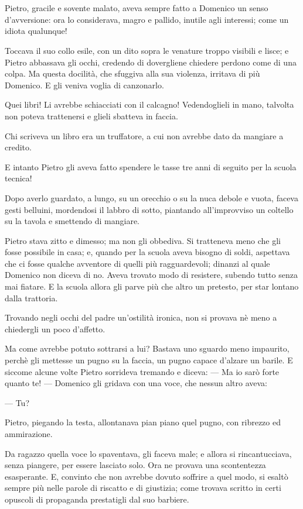 \chapter{}

Pietro, gracile e sovente malato, aveva sempre fatto a Domenico un senso d’avversione: ora lo considerava, magro e pallido, inutile agli interessi; come un idiota qualunque!

Toccava il suo collo esile, con un dito sopra le venature troppo visibili e lisce; e Pietro abbassava gli occhi, credendo di dovergliene chiedere perdono come di una colpa. Ma questa docilità, che sfuggiva alla sua violenza, irritava di più Domenico. E gli veniva voglia di canzonarlo.

Quei libri! Li avrebbe schiacciati con il calcagno! Vedendoglieli in mano, talvolta non poteva trattenersi e glieli sbatteva in faccia.

Chi scriveva un libro era un truffatore, a cui non avrebbe dato da mangiare a credito.

E intanto Pietro gli aveva fatto spendere le tasse tre anni di seguito per la scuola tecnica!

Dopo averlo guardato, a lungo, su un orecchio o su la nuca debole e vuota, faceva gesti belluini, mordendosi il labbro di sotto, piantando all’improvviso un coltello su la tavola e smettendo di mangiare.

Pietro stava zitto e dimesso; ma non gli obbediva. Si tratteneva meno che gli fosse possibile in casa; e, quando per la scuola aveva bisogno di soldi, aspettava che ci fosse qualche avventore di quelli più ragguardevoli; dinanzi al quale Domenico non diceva di no. Aveva trovato modo di resistere, subendo tutto senza mai fiatare. E la scuola allora gli parve più che altro un pretesto, per star lontano dalla trattoria.

Trovando negli occhi del padre un’ostilità ironica, non si provava nè meno a chiedergli un poco d’affetto.

Ma come avrebbe potuto sottrarsi a lui? Bastava uno sguardo meno impaurito, perchè gli mettesse un pugno su la faccia, un pugno capace d’alzare un barile. E siccome alcune volte Pietro sorrideva tremando e diceva: — Ma io sarò forte quanto te! — Domenico gli gridava con una voce, che nessun altro aveva:

— Tu?

Pietro, piegando la testa, allontanava pian piano quel pugno, con ribrezzo ed ammirazione.

Da ragazzo quella voce lo spaventava, gli faceva male; e allora si rincantucciava, senza piangere, per essere lasciato solo. Ora ne provava una scontentezza esasperante. E, convinto che non avrebbe dovuto soffrire a quel modo, si esaltò sempre più nelle parole di riscatto e di giustizia; come trovava scritto in certi opuscoli di propaganda prestatigli dal suo barbiere.

